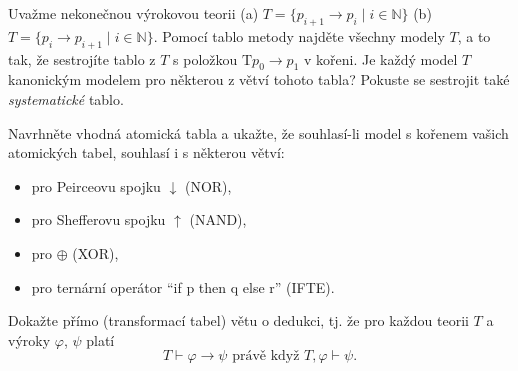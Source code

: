 \documentclass[a4paper,12pt]{article}
\begin{document}
\medskip\begin{problem}
    Uvažme nekonečnou výrokovou teorii (a) $T=\{p_{i+1} \to p_i\mid i\in \mathbb{N}\}$ (b) $T=\{p_i \to p_{i+1}\mid i\in \mathbb{N}\}$. Pomocí tablo metody najděte všechny modely $T$, a to tak, že sestrojíte tablo z $T$ s položkou $\mathrm{T}p_0\to p_1$ v kořeni. Je každý model $T$ kanonickým modelem pro některou z větví tohoto tabla? Pokuste se sestrojit také \emph{systematické} tablo.
\end{problem}




\medskip\begin{problem} 
    Navrhněte vhodná atomická tabla a ukažte, že souhlasí-li model s kořenem vašich atomických tabel, souhlasí i s některou větví:
    \begin{itemize}
        \item pro Peirceovu spojku $\downarrow$ (NOR),
        \item pro Shefferovu spojku $\uparrow$ (NAND),
        \item pro $\oplus$ (XOR),
        \item pro ternární operátor ``if p then q else r'' (IFTE).
    \end{itemize}  
    
\end{problem}


\medskip\begin{problem}
    Dokažte přímo (transformací tabel) větu o dedukci, tj. že pro každou teorii $T$ a výroky $\varphi$, $\psi$ platí
    $$T \vdash \varphi\to \psi\text{\ \ právě když\ \ }T,\varphi \vdash \psi.$$
    \end{problem}
\end{document}
